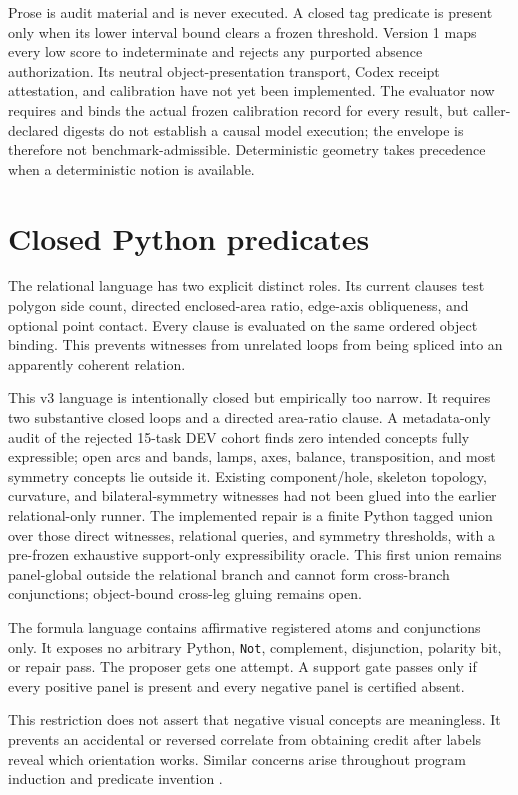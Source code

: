 \documentclass[11pt]{article}
\begin{document}
Prose is audit material and is never executed.  A closed tag predicate is
present only when its lower interval bound clears a frozen threshold.  Version
1 maps every low score to indeterminate and rejects any purported absence
authorization.  Its neutral object-presentation transport, Codex receipt
attestation, and calibration have not yet been implemented.  The evaluator now
requires and binds the actual frozen calibration record for every result, but
caller-declared digests do not establish a causal model execution; the envelope
is therefore not benchmark-admissible.  Deterministic geometry takes precedence
when a deterministic notion is available.

\section{Closed Python predicates}

The relational language has two explicit distinct roles.  Its current clauses
test polygon side count, directed enclosed-area ratio, edge-axis obliqueness,
and optional point contact.  Every clause is evaluated on the same ordered
object binding.  This prevents witnesses from unrelated loops from being
spliced into an apparently coherent relation.

This v3 language is intentionally closed but empirically too narrow.  It
requires two substantive closed loops and a directed area-ratio clause.  A
metadata-only audit of the rejected 15-task DEV cohort finds zero intended
concepts fully expressible; open arcs and bands, lamps, axes, balance,
transposition, and most symmetry concepts lie outside it.  Existing
component/hole, skeleton topology, curvature, and bilateral-symmetry witnesses
had not been glued into the earlier relational-only runner.  The implemented
repair is a finite Python tagged union over those direct witnesses, relational
queries, and symmetry thresholds,
with a pre-frozen exhaustive support-only expressibility oracle.  This first
union remains panel-global outside the relational branch and cannot form
cross-branch conjunctions; object-bound cross-leg gluing remains open.

The formula language contains affirmative registered atoms and conjunctions
only.  It exposes no arbitrary Python, \texttt{Not}, complement, disjunction,
polarity bit, or repair pass.  The proposer gets one attempt.  A support gate
passes only if every positive panel is present and every negative panel is
certified absent.

This restriction does not assert that negative visual concepts are
meaningless.  It prevents an accidental or reversed correlate from obtaining
credit after labels reveal which orientation works.  Similar concerns arise
throughout program induction and predicate invention
\cite{muggleton1994predicate,cropper2021ilp30,ellis2020dreamcoder}.
\end{document}
